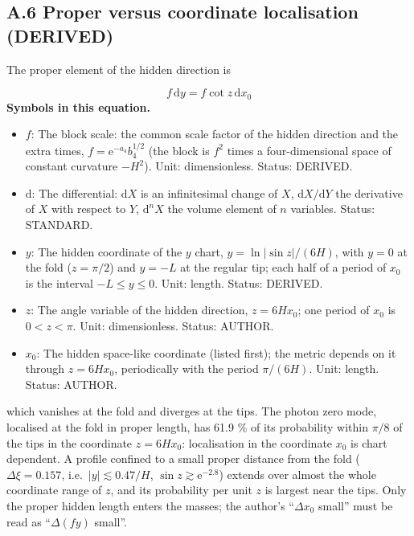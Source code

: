 \documentclass[
  10pt,
]{article}
\providecommand{\tightlist}{%
  \setlength{\itemsep}{0pt}\setlength{\parskip}{0pt}}
\begin{document}
\hypertarget{a.6-proper-versus-coordinate-localisation-derived}{%
\subsection*{A.6 Proper versus coordinate localisation
(DERIVED)}\label{a.6-proper-versus-coordinate-localisation-derived}}

The proper element of the hidden direction is

\[ f\,\mathrm{d}y = f\cot z\,\mathrm{d}x_0 \] \textbf{Symbols in this
equation.}

\begin{itemize}
\tightlist
\item
  \(f\): The block scale: the common scale factor of the hidden
  direction and the extra times, \(f = \mathrm{e}^{-a_4}b_4^{1/2}\) (the
  block is \(f^2\) times a four-dimensional space of constant curvature
  \(-H^2\)). Unit: dimensionless. Status: DERIVED.
\item
  \(\mathrm{d}\): The differential: \(\mathrm{d}X\) is an infinitesimal
  change of \(X\), \(\mathrm{d}X/\mathrm{d}Y\) the derivative of \(X\)
  with respect to \(Y\), \(\mathrm{d}^nX\) the volume element of \(n\)
  variables. Status: STANDARD.
\item
  \(y\): The hidden coordinate of the \(y\) chart,
  \(y = \ln\lvert\sin z\rvert/(6H)\), with \(y = 0\) at the fold
  (\(z = \pi/2\)) and \(y = -L\) at the regular tip; each half of a
  period of \(x_0\) is the interval \(-L \le y \le 0\). Unit: length.
  Status: DERIVED.
\item
  \(z\): The angle variable of the hidden direction, \(z = 6Hx_0\); one
  period of \(x_0\) is \(0 < z < \pi\). Unit: dimensionless. Status:
  AUTHOR.
\item
  \(x_0\): The hidden space-like coordinate (listed first); the metric
  depends on it through \(z = 6Hx_0\), periodically with the period
  \(\pi/(6H)\). Unit: length. Status: AUTHOR.
\end{itemize}

which vanishes at the fold and diverges at the tips. The photon zero
mode, localised at the fold in proper length, has 61.9 \% of its
probability within \(\pi/8\) of the tips in the coordinate
\(z = 6Hx_0\): localisation in the coordinate \(x_0\) is chart
dependent. A profile confined to a small proper distance from the fold
(\(\Delta\xi = 0.157\), i.e.~\(\lvert y\rvert \lesssim 0.47/H\),
\(\sin z \gtrsim \mathrm{e}^{-2.8}\)) extends over almost the whole
coordinate range of \(z\), and its probability per unit \(z\) is largest
near the tips. Only the proper hidden length enters the masses; the
author's ``\(\Delta x_0\) small'' must be read as ``\(\Delta(fy)\)
small''.
\end{document}
